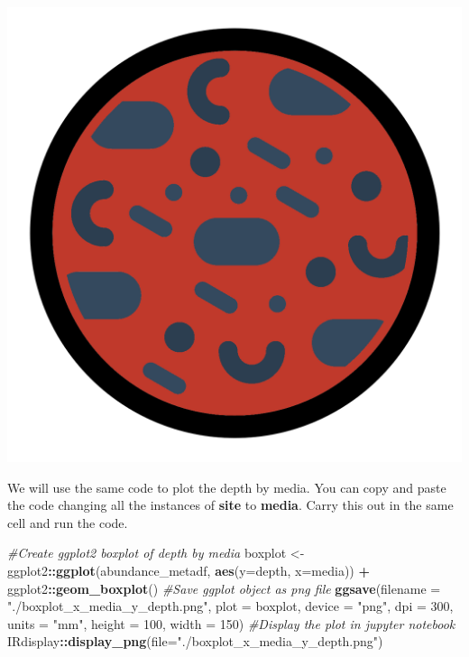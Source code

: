 \documentclass[
]{book}
\newenvironment{Shaded}{\begin{snugshade}}{\end{snugshade}}
\newcommand{\AttributeTok}[1]{\textcolor[rgb]{0.13,0.29,0.53}{#1}}
\newcommand{\CommentTok}[1]{\textcolor[rgb]{0.56,0.35,0.01}{\textit{#1}}}
\newcommand{\DecValTok}[1]{\textcolor[rgb]{0.00,0.00,0.81}{#1}}
\newcommand{\FunctionTok}[1]{\textcolor[rgb]{0.13,0.29,0.53}{\textbf{#1}}}
\newcommand{\NormalTok}[1]{#1}
\newcommand{\OtherTok}[1]{\textcolor[rgb]{0.56,0.35,0.01}{#1}}
\newcommand{\SpecialCharTok}[1]{\textcolor[rgb]{0.81,0.36,0.00}{\textbf{#1}}}
\newcommand{\StringTok}[1]{\textcolor[rgb]{0.31,0.60,0.02}{#1}}
\begin{document}
\includegraphics{figures/petri.png}

We will use the same code to plot the depth by media.
You can copy and paste the code changing all the instances of \textbf{site} to \textbf{media}.
Carry this out in the same cell and run the code.

\begin{Shaded}
\begin{Highlighting}[]
\CommentTok{\#Create ggplot2 boxplot of depth by media}
\NormalTok{boxplot }\OtherTok{\textless{}{-}}\NormalTok{ ggplot2}\SpecialCharTok{::}\FunctionTok{ggplot}\NormalTok{(abundance\_metadf, }\FunctionTok{aes}\NormalTok{(}\AttributeTok{y=}\NormalTok{depth, }\AttributeTok{x=}\NormalTok{media)) }\SpecialCharTok{+}
\NormalTok{  ggplot2}\SpecialCharTok{::}\FunctionTok{geom\_boxplot}\NormalTok{()}
\CommentTok{\#Save ggplot object as png file}
\FunctionTok{ggsave}\NormalTok{(}\AttributeTok{filename =} \StringTok{"./boxplot\_x\_media\_y\_depth.png"}\NormalTok{, }\AttributeTok{plot =}\NormalTok{ boxplot,}
       \AttributeTok{device =} \StringTok{"png"}\NormalTok{, }\AttributeTok{dpi =} \DecValTok{300}\NormalTok{, }\AttributeTok{units =} \StringTok{"mm"}\NormalTok{, }\AttributeTok{height =} \DecValTok{100}\NormalTok{, }\AttributeTok{width =} \DecValTok{150}\NormalTok{)}
\CommentTok{\#Display the plot in jupyter notebook}
\NormalTok{IRdisplay}\SpecialCharTok{::}\FunctionTok{display\_png}\NormalTok{(}\AttributeTok{file=}\StringTok{"./boxplot\_x\_media\_y\_depth.png"}\NormalTok{)}
\end{Highlighting}
\end{Shaded}
\end{document}
